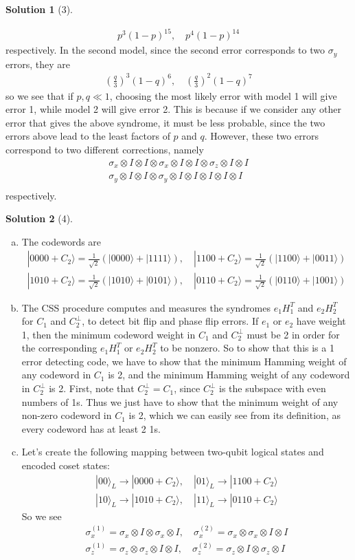 \documentclass[11pt]{article}
\theoremstyle{definition}
\newtheorem*{solution}{Solution}
\newcommand{\eq}{\begin{equation}\begin{aligned}}
\newcommand{\qe}{\end{aligned}\end{equation}}
\newcommand{\ket}[1]{|#1\rangle}
\begin{document}
\begin{solution}[3]
\begin{enumerate}[(a)]
    \eq
      p^3(1-p)^{15},\quad p^4(1-p)^{14}
    \qe
    respectively. In the second model, since the second error corresponds to two $\sigma_y$ errors, they are
    \eq
      \left(\frac{q}{3}\right)^3(1-q)^6,\quad \left(\frac{q}{3}\right)^2(1-q)^7
    \qe
    so we see that if $p,q\ll 1$, choosing the most likely error with model 1 will give error 1, while model 2 will give error 2. This is because if we consider any other error that gives the above syndrome, it must be less probable, since the two errors above lead to the least factors of $p$ and $q$. However, these two errors correspond to two different corrections, namely
    \eq
      \sigma_x\otimes I\otimes I\otimes \sigma_x\otimes I\otimes I\otimes \sigma_z\otimes I\otimes I\\
      \sigma_y\otimes I\otimes I\otimes \sigma_y\otimes I\otimes I\otimes I\otimes I\otimes I\\
    \qe
    respectively.
  \end{enumerate}
\end{solution}

\begin{solution}[4]
  \begin{enumerate}[(a)]
    \item The codewords are
    \eq
      \ket{0000+C_2}=\frac{1}{\sqrt{2}}(\ket{0000}+\ket{1111}),\quad
      \ket{1100+C_2}=\frac{1}{\sqrt{2}}(\ket{1100}+\ket{0011})\\
      \ket{1010+C_2}=\frac{1}{\sqrt{2}}(\ket{1010}+\ket{0101}),\quad
      \ket{0110+C_2}=\frac{1}{\sqrt{2}}(\ket{0110}+\ket{1001})
    \qe
    \item The CSS procedure computes and measures the syndromes $e_1H_1^{T}$ and $e_2H_2^T$ for $C_1$ and $C_2^{\perp}$, to detect bit flip and phase flip errors. If $e_1$ or $e_2$ have weight 1, then the minimum codeword weight in $C_1$ and $C_2^{\perp}$ must be 2 in order for the corresponding $e_1H_1^T$ or $e_2H_2^T$ to be nonzero. So to show that this is a 1 error detecting code, we have to show that the minimum Hamming weight of any codeword in $C_1$ is 2, and the minimum Hamming weight of any codeword in $C_2^{\perp}$ is 2. First, note that $C_2^{\perp}=C_1$, since $C_2^{\perp}$ is the subspace with even numbers of 1s. Thus we just have to show that the minimum weight of any non-zero codeword in $C_1$ is 2, which we can easily see from its definition, as every codeword has at least 2 1s.
    \item Let's create the following mapping between two-qubit logical states and encoded coset states:
    \eq
      \ket{00}_L\to\ket{0000+C_2},\quad
      \ket{01}_L\to\ket{1100+C_2}\\
      \ket{10}_L\to\ket{1010+C_2},\quad
      \ket{11}_L\to\ket{0110+C_2}
    \qe
    So we see
    \eq
      \sigma_x^{(1)}=\sigma_x\otimes I\otimes \sigma_x\otimes I,\quad
      \sigma_x^{(2)}=\sigma_x\otimes \sigma_x\otimes I\otimes I\\
      \sigma_z^{(1)}=\sigma_z\otimes \sigma_z\otimes I\otimes I,\quad
      \sigma_z^{(2)}=\sigma_z\otimes I\otimes \sigma_z\otimes I
    \qe
  \end{enumerate}
\end{solution}
\end{document}
